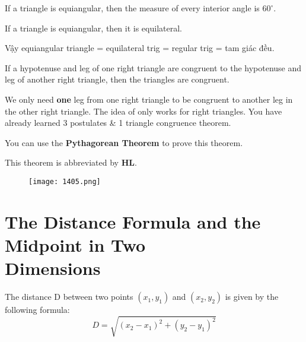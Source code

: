 \begin{tcolorbox}[colback=red!5!white,colframe=red!75!black,title=The Equiangular Triangle Theorem]
  If a triangle is equiangular, then the measure of every interior angle is $60^{\circ}$.
\end{tcolorbox}

\vspace{.4cm}

\begin{tcolorbox}[colback=red!5!white,colframe=red!75!black,title=The Equilateral Triangle Converse Theorem]
  If a triangle is equiangular, then it is equilateral.
\end{tcolorbox}

Vậy equiangular triangle = equilateral trig = regular trig = tam giác đều.

\vspace{.5cm}

\begin{tcolorbox}[colback=red!5!white,colframe=red!75!black,title=The Hypotenuse-Leg Congruence Theorem]
  If a hypotenuse and leg of one right triangle are congruent to the hypotenuse and leg of another right triangle, then the triangles are congruent.
\end{tcolorbox}

We only need \textbf{one} leg from one right triangle to be congruent to another leg in the other right triangle. The idea of  only works for right triangles. You have already learned 3 postulates \& 1 triangle congruence theorem.

You can use the \textbf{Pythagorean Theorem} to prove this theorem.

This theorem is abbreviated by \textbf{HL}.

\newpage

\begin{figure}[htb!]
  \centering
  \texttt{[image: 1405.png]}
\end{figure}

\section{The Distance Formula and the Midpoint in Two\\ Dimensions}

\begin{tcolorbox}[enhanced,attach boxed title to top center={yshift=-3mm,yshifttext=-1mm},
  colback=blue!5!white,colframe=blue!75!black,colbacktitle=red!80!black,
  title=The Distance Formula,fonttitle=\bfseries,
  boxed title style={size=small,colframe=red!50!black} ]
  The distance D between two points $(x_{1},y_{1})$ and $(x_{2},y_{2})$ is given by the following formula:
  \[D=\sqrt{(x_{2}-x_{1})^{2}+(y_{2}-y_{1})^{2}}\]
\end{tcolorbox}

